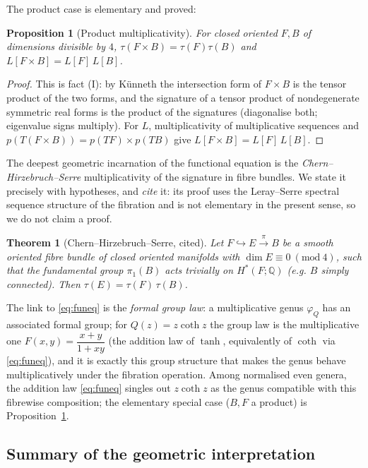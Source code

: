 \documentclass[12pt]{article}
\newtheorem{theorem}{Theorem}
\newtheorem{proposition}{Proposition}
\theoremstyle{definition}
\begin{document}
The product case is elementary and proved:

\begin{proposition}[Product multiplicativity]\label{prop:prodmult}
For closed oriented $F,B$ of dimensions divisible by $4$,
$\tau(F\times B)=\tau(F)\tau(B)$ and $L[F\times B]=L[F]\,L[B]$.
\end{proposition}

\begin{proof}
This is fact (I): by K\"unneth the intersection form of $F\times B$ is the tensor product
of the two forms, and the signature of a tensor product of nondegenerate symmetric real
forms is the product of the signatures (diagonalise both; eigenvalue signs multiply). For
$L$, multiplicativity of multiplicative sequences and $p(T(F\times B))=p(TF)\times p(TB)$
give $L[F\times B]=L[F]\,L[B]$.
\end{proof}

The deepest geometric incarnation of the functional equation is the
\emph{Chern--Hirzebruch--Serre} multiplicativity of the signature in fibre bundles. We
state it precisely with hypotheses, and \emph{cite} it: its proof uses the Leray--Serre
spectral sequence structure of the fibration and is not elementary in the present sense, so
we do not claim a proof.

\begin{theorem}[Chern--Hirzebruch--Serre, cited]\label{thm:CHS}
Let $F\hookrightarrow E\xrightarrow{\pi}B$ be a smooth oriented fibre bundle of closed
oriented manifolds with $\dim E\equiv0\ (\mathrm{mod}\ 4)$, such that the fundamental group
$\pi_1(B)$ acts trivially on $H^\ast(F;\mathbb Q)$ (e.g. $B$ simply connected). Then
$\tau(E)=\tau(F)\,\tau(B)$.
\end{theorem}

The link to \eqref{eq:funeq} is the \emph{formal group law}: a multiplicative genus
$\varphi_Q$ has an associated formal group; for $Q(z)=z\coth z$ the group law is the
multiplicative one $F(x,y)=\dfrac{x+y}{1+xy}$ (the addition law of $\tanh$, equivalently of
$\coth$ via \eqref{eq:funeq}), and it is exactly this group structure that makes the genus
behave multiplicatively under the fibration operation. Among normalised even genera, the
addition law \eqref{eq:funeq} singles out $z\coth z$ as the genus compatible with this
fibrewise composition; the elementary special case ($B,F$ a product) is
Proposition~\ref{prop:prodmult}.

\subsection*{Summary of the geometric interpretation}
\end{document}

